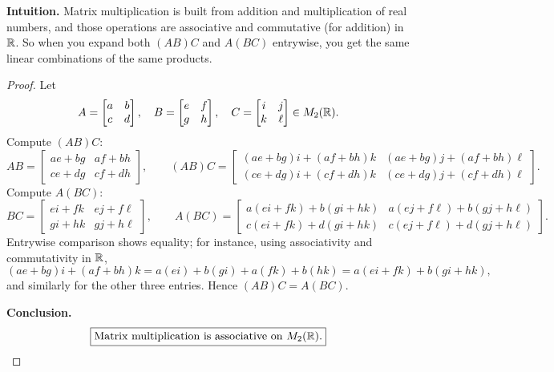 \documentclass[12pt]{article}
\theoremstyle{definition}
\begin{document}
\dotfill

\noindent\textbf{Intuition.}
Matrix multiplication is built from addition and multiplication of real numbers, and those operations are associative and commutative (for addition) in $\Bbb R$. So when you expand both $(AB)C$ and $A(BC)$ entrywise, you get the same linear combinations of the same products.

\dotfill

\begin{proof}
Let
\[
A=\begin{bmatrix}a&b\\ c&d\end{bmatrix},\quad
B=\begin{bmatrix}e&f\\ g&h\end{bmatrix},\quad
C=\begin{bmatrix}i&j\\ k&\ell\end{bmatrix}\in M_2(\Bbb R).
\]
Compute $(AB)C$:
\[
AB=\begin{bmatrix}
ae+bg & af+bh\\
ce+dg & cf+dh
\end{bmatrix},
\qquad
(AB)C=\begin{bmatrix}
(ae+bg)i+(af+bh)k & (ae+bg)j+(af+bh)\ell\\[2pt]
(ce+dg)i+(cf+dh)k & (ce+dg)j+(cf+dh)\ell
\end{bmatrix}.
\]
Compute $A(BC)$:
\[
BC=\begin{bmatrix}
ei+fk & ej+f\ell\\
gi+hk & gj+h\ell
\end{bmatrix},
\qquad
A(BC)=\begin{bmatrix}
a(ei+fk)+b(gi+hk) & a(ej+f\ell)+b(gj+h\ell)\\[2pt]
c(ei+fk)+d(gi+hk) & c(ej+f\ell)+d(gj+h\ell)
\end{bmatrix}.
\]
Entrywise comparison shows equality; for instance, using associativity and commutativity in $\Bbb R$,
\[
(ae+bg)i+(af+bh)k
= a(ei)+b(gi)+a(fk)+b(hk)
= a(ei+fk)+b(gi+hk),
\]
and similarly for the other three entries. Hence $(AB)C=A(BC)$.

\smallskip
\noindent\textbf{Conclusion.}
\[
\boxed{\text{Matrix multiplication is associative on }M_2(\Bbb R).}
\]
\end{proof}

\newpage
\end{document}
